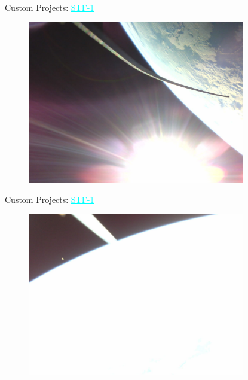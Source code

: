 \begin{frame}{Custom Projects: \href{http://stf1.com/}{\textcolor{cyan}{\underline{STF-1}}}}

    \begin{figure}[!ht]
        \begin{center}
            \includegraphics[width=9.5cm]{figures/stf-1-ex3.jpg}
        \end{center}
    \end{figure}

\end{frame}

\begin{frame}{Custom Projects: \href{http://stf1.com/}{\textcolor{cyan}{\underline{STF-1}}}}

    \begin{figure}[!ht]
        \begin{center}
            \includegraphics[width=9.5cm]{figures/stf-1-ex4.jpg}
        \end{center}
    \end{figure}

\end{frame}

